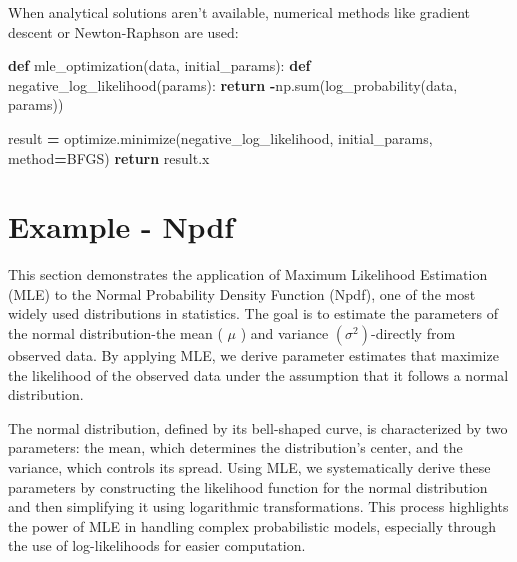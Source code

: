 \documentclass[
  12 pt,
  a4paper,
]{book}
\newenvironment{Shaded}{\begin{snugshade}}{\end{snugshade}}
\newcommand{\BuiltInTok}[1]{#1}
\newcommand{\ControlFlowTok}[1]{\textcolor[rgb]{0.13,0.29,0.53}{\textbf{#1}}}
\newcommand{\KeywordTok}[1]{\textcolor[rgb]{0.13,0.29,0.53}{\textbf{#1}}}
\newcommand{\NormalTok}[1]{#1}
\newcommand{\OperatorTok}[1]{\textcolor[rgb]{0.81,0.36,0.00}{\textbf{#1}}}
\newcommand{\StringTok}[1]{\textcolor[rgb]{0.31,0.60,0.02}{#1}}
\numberwithin{equation}{section}
\theoremstyle{plain}      %
\theoremstyle{definition} %
\theoremstyle{remark}     %
\theoremstyle{note}         %
\begin{document}
When analytical solutions aren't available, numerical methods like
gradient descent or Newton-Raphson are used:

\scriptsize

\begin{Shaded}
\begin{Highlighting}[]
\KeywordTok{def}\NormalTok{ mle\_optimization(data, initial\_params):}
    \KeywordTok{def}\NormalTok{ negative\_log\_likelihood(params):}
        \ControlFlowTok{return} \OperatorTok{{-}}\NormalTok{np.}\BuiltInTok{sum}\NormalTok{(log\_probability(data, params))}
    
\NormalTok{    result }\OperatorTok{=}\NormalTok{ optimize.minimize(negative\_log\_likelihood, }
\NormalTok{                             initial\_params,}
\NormalTok{                             method}\OperatorTok{=}\StringTok{\textquotesingle{}BFGS\textquotesingle{}}\NormalTok{)}
    \ControlFlowTok{return}\NormalTok{ result.x}
\end{Highlighting}
\end{Shaded}

\normalsize

\newpage

\hypertarget{example---npdf}{%
\section{Example - Npdf}\label{example---npdf}}

This section demonstrates the application of Maximum Likelihood
Estimation (MLE) to the Normal Probability Density Function (Npdf), one
of the most widely used distributions in statistics. The goal is to
estimate the parameters of the normal distribution-the mean ( \(\mu\) )
and variance \(\left(\sigma^2\right)\)-directly from observed data. By
applying MLE, we derive parameter estimates that maximize the likelihood
of the observed data under the assumption that it follows a normal
distribution.

The normal distribution, defined by its bell-shaped curve, is
characterized by two parameters: the mean, which determines the
distribution's center, and the variance, which controls its spread.
Using MLE, we systematically derive these parameters by constructing the
likelihood function for the normal distribution and then simplifying it
using logarithmic transformations. This process highlights the power of
MLE in handling complex probabilistic models, especially through the use
of log-likelihoods for easier computation.
\end{document}
